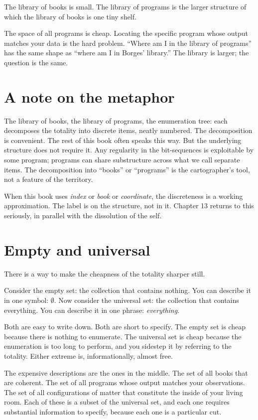 The library of books is small. The library of programs is the larger structure of which the library of books is one tiny shelf.

The space of all programs is cheap. Locating the specific program whose output matches your data is the hard problem. ``Where am I in the library of programs'' has the same shape as ``where am I in Borges' library.'' The library is larger; the question is the same.

\section*{A note on the metaphor}

The library of books, the library of programs, the enumeration tree: each decomposes the totality into discrete items, neatly numbered. The decomposition is convenient. The rest of this book often speaks this way. But the underlying structure does not require it. Any regularity in the bit-sequences is exploitable by some program; programs can share substructure across what we call separate items. The decomposition into ``books'' or ``programs'' is the cartographer's tool, not a feature of the territory.

When this book uses \emph{index} or \emph{book} or \emph{coordinate}, the discreteness is a working approximation. The label is on the structure, not in it. Chapter 13 returns to this seriously, in parallel with the dissolution of the self.

\section*{Empty and universal}

There is a way to make the cheapness of the totality sharper still.

Consider the empty set: the collection that contains nothing. You can describe it in one symbol: $\emptyset$. Now consider the universal set: the collection that contains everything. You can describe it in one phrase: \emph{everything}.

Both are easy to write down. Both are short to specify. The empty set is cheap because there is nothing to enumerate. The universal set is cheap because the enumeration is too long to perform, and you sidestep it by referring to the totality. Either extreme is, informationally, almost free.

The expensive descriptions are the ones in the middle. The set of all books that are coherent. The set of all programs whose output matches your observations. The set of all configurations of matter that constitute the inside of your living room. Each of these is a subset of the universal set, and each one requires substantial information to specify, because each one is a particular cut.

